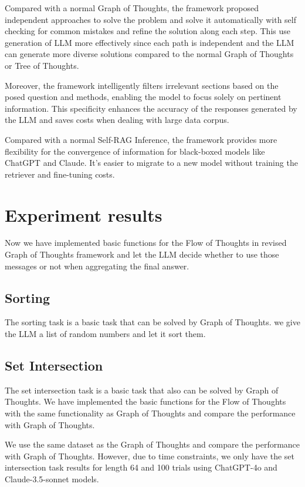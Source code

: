 \documentclass{article}
\begin{document}
Compared with a normal Graph of Thoughts, the framework proposed independent approaches to solve the problem and solve it automatically with self checking for common mistakes and refine the solution along each step. This use generation of LLM more effectively since each path is independent and the LLM can generate more diverse solutions compared to the normal Graph of Thoughts or Tree of Thoughts.

Moreover, the framework intelligently filters irrelevant sections based on the posed question and methods, enabling the model to focus solely on pertinent information. This specificity enhances the accuracy of the responses generated by the LLM and saves costs when dealing with large data corpus.

Compared with a normal Self-RAG Inference, the framework provides more flexibility for the convergence of information for black-boxed models like ChatGPT and Claude. It's easier to migrate to a new model without training the retriever and fine-tuning costs.

\section{Experiment results}

Now we have implemented basic functions for the Flow of Thoughts in revised Graph of Thoughts framework and let the LLM decide whether to use those messages or not when aggregating the final answer.

\subsection{Sorting}

The sorting task is a basic task that can be solved by Graph of Thoughts. we give the LLM a list of random numbers and let it sort them. 

\subsection{Set Intersection}

The set intersection task is a basic task that also can be solved by Graph of Thoughts. We have implemented the basic functions for the Flow of Thoughts with the same functionality as Graph of Thoughts and compare the performance with Graph of Thoughts.

We use the same dataset as the Graph of Thoughts and compare the performance with Graph of Thoughts. However, due to time constraints, we only have the set intersection task results for length 64 and 100 trials using ChatGPT-4o and Claude-3.5-sonnet models.
\end{document}

